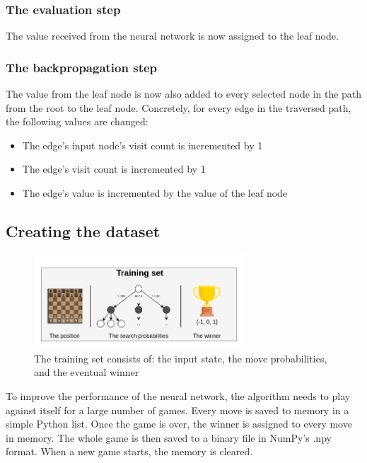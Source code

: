\documentclass{article}
\begin{document}
\subsubsection{The evaluation step}

The value received from the neural network is now assigned to the leaf node.

\subsubsection{The backpropagation step}

The value from the leaf node is now also added to every selected node in the path from the root to the leaf node.
Concretely, for every edge in the traversed path, the following values are changed:

\begin{itemize}
    \item The edge's input node's visit count is incremented by 1
    \item The edge's visit count is incremented by 1
    \item The edge's value is incremented by the value of the leaf node
\end{itemize}


\subsection{Creating the dataset}


\begin{figure}[H]
    \centering
    \includegraphics[width=0.7\textwidth]{img/trainingset.png}
    \caption{The training set consists of: the input state, the move probabilities, and the eventual winner}
\end{figure}

To improve the performance of the neural network, the algorithm needs to play against itself for a large number of games.
Every move is saved to memory in a simple Python list. Once the game is over, the winner is assigned to every move in memory.
The whole game is then saved to a binary file in NumPy's .npy format. 
When a new game starts, the memory is cleared.
\end{document}

